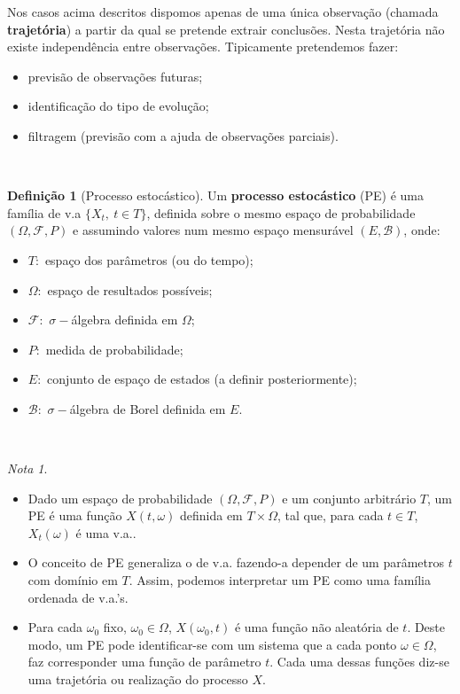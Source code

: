 \documentclass[
  11pt,
  a4paper,
]{book}
\theoremstyle{definition}
\newtheorem{definition}{Definição}[chapter]
\theoremstyle{definition}
\theoremstyle{definition}
\theoremstyle{definition}
\theoremstyle{remark}
\newtheorem*{remark}{Nota }
\begin{document}
Nos casos acima descritos dispomos apenas de uma única observação (chamada \textbf{trajetória}) a
partir da qual se pretende extrair conclusões. Nesta trajetória não existe independência
entre observações. Tipicamente pretendemos fazer:

\begin{itemize}
\item
  previsão de observações futuras;
\item
  identificação do tipo de evolução;
\item
  filtragem (previsão com a ajuda de observações parciais).
\end{itemize}

\(\,\)

\begin{definition}[Processo estocástico]

Um \textbf{processo estocástico} (PE) é uma família de v.a \(\{X_t, ~t \in T\}\), definida sobre o
mesmo espaço de probabilidade \((\Omega, \mathcal{F}, P)\) e assumindo valores num mesmo
espaço mensurável \((E,\mathcal{B})\), onde:

\begin{itemize}
\item
  \(T:\) espaço dos parâmetros (ou do tempo);
\item
  \(\Omega:\) espaço de resultados possíveis;
\item
  \(\mathcal{F}:\) \(\sigma-\)álgebra definida em \(\Omega\);
\item
  \(P:\) medida de probabilidade;
\item
  \(E:\) conjunto de espaço de estados (a definir posteriormente);
\item
  \(\mathcal{B}:\) \(\sigma-\)álgebra de Borel definida em \(E\).
\end{itemize}

\end{definition}

\(\,\)

\begin{remark}
\leavevmode

\begin{itemize}
\item
  Dado um espaço de probabilidade \((\Omega, \mathcal{F}, P)\) e um conjunto arbitrário \(T\),
  um PE é uma função \(X(t,\omega)\) definida em \(T \times \Omega\), tal que, para cada
  \(t \in T\), \(X_t(\omega)\) é uma v.a..
\item
  O conceito de PE generaliza o de v.a. fazendo-a depender de um parâmetros \(t\) com
  domínio em \(T\). Assim, podemos interpretar um PE como uma família ordenada de v.a.'s.
\item
  Para cada \(\omega_0\) fixo, \(\omega_0 \in \Omega\), \(X(\omega_0,t)\) é uma função não
  aleatória de \(t\). Deste modo, um PE pode identificar-se com um sistema que a cada ponto
  \(\omega \in \Omega\), faz corresponder uma função de parâmetro \(t\). Cada uma dessas
  funções diz-se uma trajetória ou realização do processo \(X\).
\end{itemize}

\end{remark}
\end{document}
